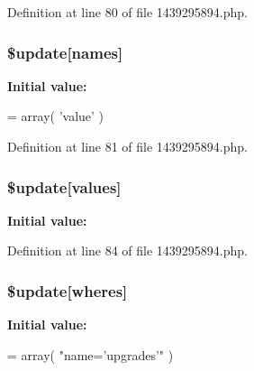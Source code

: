 Definition at line 80 of file 1439295894.\+php.

\subsubsection[{\texorpdfstring{\$update}{$update}}]{\setlength{\rightskip}{0pt plus 5cm}\${\bf update}\mbox{[}\textquotesingle{}names\textquotesingle{}\mbox{]}}\hypertarget{1439295894_8php_abcf5ad2e4fef35de04bef0168cc91ddc}{}\label{1439295894_8php_abcf5ad2e4fef35de04bef0168cc91ddc}
{\bfseries Initial value\+:}
\begin{DoxyCode}
= array(
        \textcolor{stringliteral}{'value'}
)
\end{DoxyCode}


Definition at line 81 of file 1439295894.\+php.

\subsubsection[{\texorpdfstring{\$update}{$update}}]{\setlength{\rightskip}{0pt plus 5cm}\${\bf update}\mbox{[}\textquotesingle{}values\textquotesingle{}\mbox{]}}\hypertarget{1439295894_8php_ac82a75b4c6df37380ff77c88f041785e}{}\label{1439295894_8php_ac82a75b4c6df37380ff77c88f041785e}
{\bfseries Initial value\+:}


Definition at line 84 of file 1439295894.\+php.

\subsubsection[{\texorpdfstring{\$update}{$update}}]{\setlength{\rightskip}{0pt plus 5cm}\${\bf update}\mbox{[}\textquotesingle{}wheres\textquotesingle{}\mbox{]}}\hypertarget{1439295894_8php_aacde4479a904b32d0f24dea4e01f148c}{}\label{1439295894_8php_aacde4479a904b32d0f24dea4e01f148c}
{\bfseries Initial value\+:}
\begin{DoxyCode}
= array(
        \textcolor{stringliteral}{"name='upgrades'"}
)
\end{DoxyCode}


